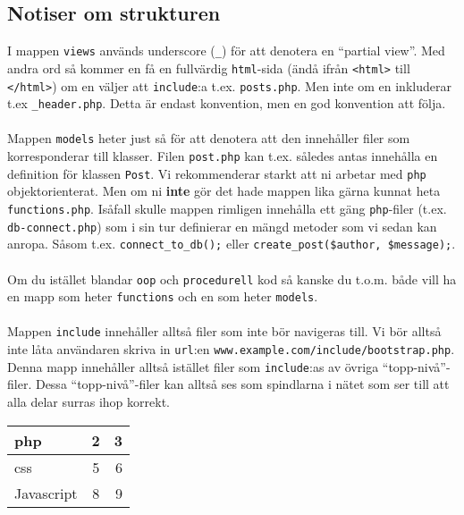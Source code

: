\documentclass[12pt]{article}
\begin{document}
\subsection{Notiser om strukturen}
I mappen \texttt{views} används underscore (\texttt{\_}) för att denotera en ``partial view''. Med andra ord så kommer en få en fullvärdig \texttt{html}-sida (ändå ifrån \texttt{<html>} till \texttt{</html>}) om en väljer att \texttt{include}:a t.ex. \texttt{posts.php}. Men inte om en inkluderar t.ex \texttt{\_header.php}. Detta är endast konvention, men en god konvention att följa.

\paragraph{}
Mappen \texttt{models} heter just så för att denotera att den innehåller filer som korresponderar till klasser. Filen \texttt{post.php} kan t.ex. således antas innehålla en definition för klassen \texttt{Post}. Vi rekommenderar starkt att ni arbetar med \texttt{php} objektorienterat. Men om ni \textbf{inte} gör det hade mappen lika gärna kunnat heta \texttt{functions.php}. Isåfall skulle mappen rimligen innehålla ett gäng \texttt{php}-filer (t.ex. \texttt{db-connect.php}) som i sin tur definierar en mängd metoder som vi sedan kan anropa. Såsom t.ex. \texttt{connect\_to\_db();} eller \texttt{create\_post(\$author, \$message);}.

\paragraph{}
Om du istället blandar \texttt{oop} och \texttt{procedurell} kod så kanske du t.o.m. både vill ha en mapp som heter \texttt{functions} och en som heter \texttt{models}.

\paragraph{}
Mappen \texttt{include} innehåller alltså filer som inte bör navigeras till. Vi bör alltså inte låta användaren skriva in \texttt{url}:en \texttt{www.example.com/include/bootstrap.php}. Denna mapp innehåller alltså istället filer som \texttt{include}:as av övriga ``topp-nivå''-filer. Dessa ``topp-nivå''-filer kan alltså ses som spindlarna i nätet som ser till att alla delar surras ihop korrekt.




\begin{tabular}{ l | c | r }
  php & 2 & 3 \\ \hline
  css & 5 & 6 \\ \hline
  Javascript & 8 & 9 \\
\end{tabular}
\end{document}
